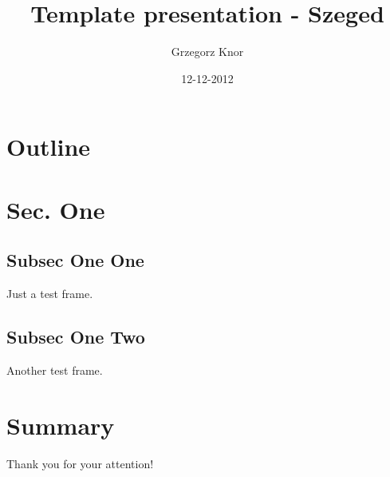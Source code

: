\documentclass[14pt,handout]{beamer}
\begin{document}
\title{Template presentation - Szeged}
\author{Grzegorz Knor}
\date{12-12-2012}

\begin{frame}
\titlepage
\end{frame}
\section*{Outline}
\begin{frame}
\tableofcontents
\end{frame}
\section{Sec. One}
\subsection{Subsec One One}
\begin{frame}
Just a test frame.
\end{frame}
\subsection{Subsec One Two}
\begin{frame}
Another test frame.
\end{frame}
\section{Summary}
\begin{frame}
Thank you for your attention!
\end{frame}
\end{document}
